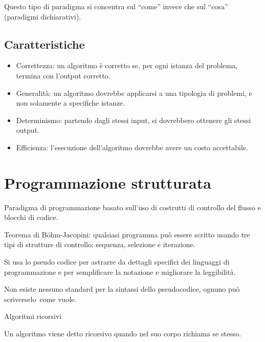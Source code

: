 \documentclass[
]{article}
\providecommand{\tightlist}{%
  \setlength{\itemsep}{0pt}\setlength{\parskip}{0pt}}
\begin{document}
{}

{Questo tipo di paradigma si concentra sul ``come'' invece che sul
``cosa'' (paradigmi dichiarativi).}

\subsection{\texorpdfstring{{Caratteristiche}}{Caratteristiche}}\label{h.c0qzu4ykbegs}

\begin{itemize}
\tightlist
\item
  {Correttezza}{: un algoritmo è corretto se, per ogni istanza del
  problema, termina con l'output corretto.}
\item
  {Generalità}{: un algoritmo dovrebbe applicarsi a una tipologia di
  problemi, e non solamente a specifiche istanze.}
\item
  {Determinismo}{: partendo dagli stessi input, si dovrebbero ottenere
  gli stessi output.}
\item
  {Efficienza}{: l'esecuzione dell'algoritmo dovrebbe avere un costo
  accettabile.}
\end{itemize}

{}

\section{\texorpdfstring{{Programmazione
strutturata}}{Programmazione strutturata}}\label{h.8aq165x5hqu2}

{Paradigma di programmazione basato sull'uso di costrutti di controllo
del flusso e blocchi di codice.}

{}

{Teorema di Böhm-Jacopini}{: }{qualsiasi programma può essere scritto
usando tre tipi di strutture di controllo: sequenza, selezione e
iterazione.}

{}

{Si usa lo pseudo codice per astrarre da dettagli specifici dei
linguaggi di programmazione e per semplificare la notazione e migliorare
la leggibilità.}

{}

{Non esiste nessuno standard per la sintassi dello pseudocodice, ognuno
può }{scriverselo}{~come vuole.}

{}

{}

{Algoritmi ricorsivi}

{Un algoritmo viene detto ricorsivo quando nel suo corpo richiama se
stesso.}
\end{document}
